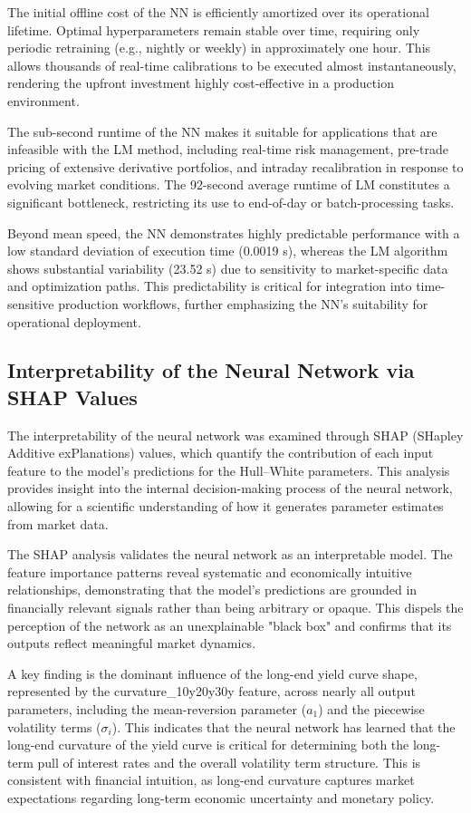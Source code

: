 The initial offline cost of the NN is efficiently amortized over its operational lifetime. Optimal hyperparameters remain stable over time, requiring only periodic retraining (e.g., nightly or weekly) in approximately one hour. This allows thousands of real-time calibrations to be executed almost instantaneously, rendering the upfront investment highly cost-effective in a production environment.

The sub-second runtime of the NN makes it suitable for applications that are infeasible with the LM method, including real-time risk management, pre-trade pricing of extensive derivative portfolios, and intraday recalibration in response to evolving market conditions. The 92-second average runtime of LM constitutes a significant bottleneck, restricting its use to end-of-day or batch-processing tasks.

Beyond mean speed, the NN demonstrates highly predictable performance with a low standard deviation of execution time (0.0019 s), whereas the LM algorithm shows substantial variability (23.52 s) due to sensitivity to market-specific data and optimization paths. This predictability is critical for integration into time-sensitive production workflows, further emphasizing the NN's suitability for operational deployment.

\subsection{Interpretability of the Neural Network via SHAP Values}
The interpretability of the neural network was examined through SHAP (SHapley Additive exPlanations) values, which quantify the contribution of each input feature to the model's predictions for the Hull–White parameters. This analysis provides insight into the internal decision-making process of the neural network, allowing for a scientific understanding of how it generates parameter estimates from market data.

The SHAP analysis validates the neural network as an interpretable model. The feature importance patterns reveal systematic and economically intuitive relationships, demonstrating that the model's predictions are grounded in financially relevant signals rather than being arbitrary or opaque. This dispels the perception of the network as an unexplainable "black box" and confirms that its outputs reflect meaningful market dynamics.

A key finding is the dominant influence of the long-end yield curve shape, represented by the curvature\_10y20y30y feature, across nearly all output parameters, including the mean-reversion parameter (\(a_1\)) and the piecewise volatility terms (\(\sigma_i\)). This indicates that the neural network has learned that the long-end curvature of the yield curve is critical for determining both the long-term pull of interest rates and the overall volatility term structure. This is consistent with financial intuition, as long-end curvature captures market expectations regarding long-term economic uncertainty and monetary policy.


